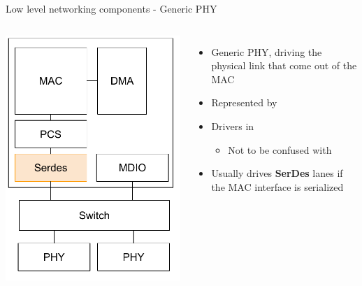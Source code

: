 \begin{frame}{Low level networking components - Generic PHY}
	\begin{columns}
			\includegraphics[width=\textwidth]{slides/networking-driver-overview/net_components_serdes.pdf}
		\begin{itemize}
			\item Generic PHY, driving the physical link that come out of the MAC
			\item Represented by 
			\item Drivers in 
				\begin{itemize}
					\item Not to be confused with 
				\end{itemize}
			\item Usually drives \textbf{SerDes} lanes if the MAC interface is serialized

\end{itemize}
\end{columns}
\end{frame}
